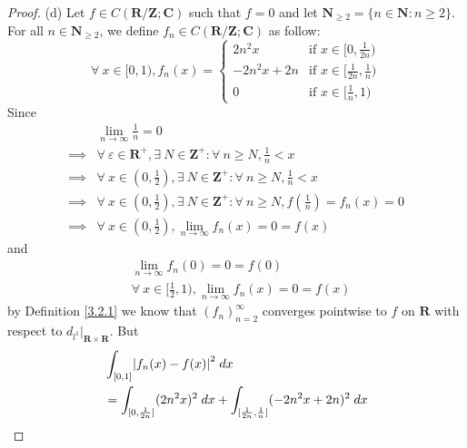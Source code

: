 \begin{proof}{(d)}
    Let \(f \in C(\mathbf{R} / \mathbf{Z} ; \mathbf{C})\) such that \(f = 0\) and let \(\mathbf{N}_{\geq 2} = \{n \in \mathbf{N} : n \geq 2\}\).
    For all \(n \in \mathbf{N}_{\geq 2}\), we define \(f_n \in C(\mathbf{R} / \mathbf{Z} ; \mathbf{C})\) as follow:
    \[
        \forall\ x \in [0, 1), f_n(x) = \begin{cases}
            2 n^2 x       & \text{if } x \in [0, \frac{1}{2n})           \\
            -2 n^2 x + 2n & \text{if } x \in [\frac{1}{2n}, \frac{1}{n}) \\
            0             & \text{if } x \in [\frac{1}{n}, 1)
        \end{cases}
    \]
    Since
    \begin{align*}
                 & \lim_{n \to \infty} \frac{1}{n} = 0                                                                           \\
        \implies & \forall\ \varepsilon \in \mathbf{R}^+, \exists\ N \in \mathbf{Z}^+ : \forall\ n \geq N, \frac{1}{n} < x       \\
        \implies & \forall\ x \in (0, \frac{1}{2}), \exists\ N \in \mathbf{Z}^+ : \forall\ n \geq N, \frac{1}{n} < x             \\
        \implies & \forall\ x \in (0, \frac{1}{2}), \exists\ N \in \mathbf{Z}^+ : \forall\ n \geq N, f(\frac{1}{n}) = f_n(x) = 0 \\
        \implies & \forall\ x \in (0, \frac{1}{2}), \lim_{n \to \infty} f_n(x) = 0 = f(x)
    \end{align*}
    and
    \begin{align*}
         & \lim_{n \to \infty} f_n(0) = 0 = f(0)                                  \\
         & \forall\ x \in [\frac{1}{2}, 1), \lim_{n \to \infty} f_n(x) = 0 = f(x)
    \end{align*}
    by Definition \ref{3.2.1} we know that \((f_n)_{n = 2}^\infty\) converges pointwise to \(f\) on \(\mathbf{R}\) with respect to \(d_{l^1}|_{\mathbf{R} \times \mathbf{R}}\).
    But
    \begin{align*}
         & \int_{[0, 1]} \abs*{f_n(x) - f(x)}^2 \; dx                                                                                                             \\
         & = \int_{[0, \frac{1}{2n}]} (2 n^2 x)^2 \; dx + \int_{[\frac{1}{2n}, \frac{1}{n}]} (-2n^2 x + 2n)^2 \; dx                                               \\

\end{align*}
\end{proof}

